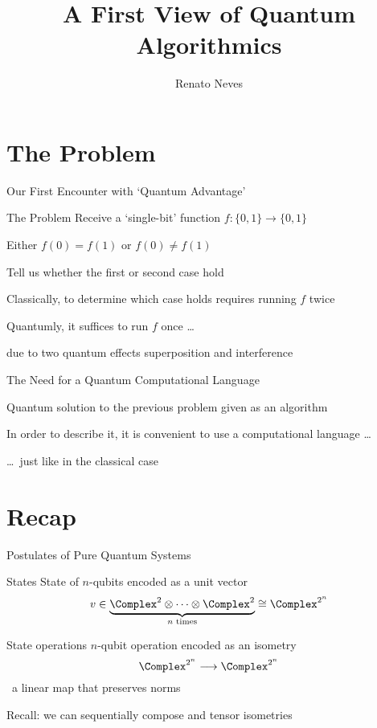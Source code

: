\documentclass{beamer}
\author[Renato Neves]{Renato Neves}
\date{}
\begin{document}
\title{A First View of Quantum Algorithmics}

\frame[plain]{\titlepage}

\section{The Problem}

\begin{frame}{Our First Encounter with `Quantum Advantage'} 

        \begin{block}{The Problem}
        Receive a `single-bit' function $f : \{0,1\} \to \{0,1\}$

        Either $f(0) = f(1)$ or $f(0) \not = f(1)$

        Tell us whether the first or second case hold
        \end{block}

        \pause
        Classically, to determine which case holds requires 
        running $f$ twice 

        \pause
        Quantumly, it suffices to run $f$ once \dots

        \pause
        due to two quantum effects
        \alert{superposition} and 
        \alert{interference}
\end{frame}

\begin{frame}{The Need for a Quantum Computational Language}

        Quantum solution to the previous problem given as
        an \alert{algorithm}
        
        In order to describe it, it is convenient to use a
        computational language \dots
        
        \dots\ just like in the classical case
\end{frame}

\section{Recap}

\begin{frame}{Postulates of Pure Quantum Systems}

        \begin{block}{States}
                State of $n$-qubits encoded as a \alert{unit} vector
                \[
                        v \in \underbrace{\Complex^2 \otimes \dots \otimes
                        \Complex^2}_{\text{$n$ times}} \cong \Complex^{2^n}
                \]
        \end{block}

        \begin{block}{State operations}
                $n$-qubit operation encoded as an \alert{isometry}
                \[
                        \Complex^{2^n} \longrightarrow \Complex^{2^n}
                \]
                \ie\ a linear map that preserves norms
        \end{block}

        \scriptsize{Recall: we can sequentially compose and tensor
        isometries}

\end{frame}
\end{document}
